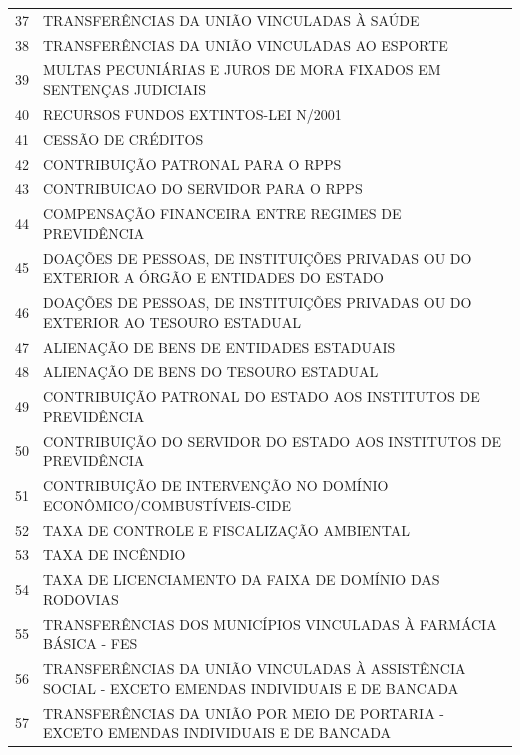 \documentclass{article}
\begin{document}
\begin{longtable}[c]{m{1cm}|m{11cm}}
\multicolumn{1}{c|}{ 37 } & TRANSFERÊNCIAS DA UNIÃO VINCULADAS À SAÚDE \\
\multicolumn{1}{c|}{ 38 } & TRANSFERÊNCIAS DA UNIÃO VINCULADAS AO ESPORTE \\
\multicolumn{1}{c|}{ 39 } & MULTAS PECUNIÁRIAS E JUROS DE MORA FIXADOS EM SENTENÇAS JUDICIAIS \\
\multicolumn{1}{c|}{ 40 } & RECURSOS FUNDOS EXTINTOS-LEI N\degree 13.848/2001 \\
\multicolumn{1}{c|}{ 41 } & CESSÃO DE CRÉDITOS \\
\multicolumn{1}{c|}{ 42 } & CONTRIBUIÇÃO PATRONAL PARA O RPPS \\
\multicolumn{1}{c|}{ 43 } & CONTRIBUICAO DO SERVIDOR PARA O RPPS \\
\multicolumn{1}{c|}{ 44 } & COMPENSAÇÃO FINANCEIRA ENTRE REGIMES DE PREVIDÊNCIA \\
\multicolumn{1}{c|}{ 45 } & DOAÇÕES DE PESSOAS, DE INSTITUIÇÕES PRIVADAS OU DO EXTERIOR A ÓRGÃO E ENTIDADES DO ESTADO \\
\multicolumn{1}{c|}{ 46 } & DOAÇÕES DE PESSOAS, DE INSTITUIÇÕES PRIVADAS OU DO EXTERIOR AO TESOURO ESTADUAL \\
\multicolumn{1}{c|}{ 47 } & ALIENAÇÃO DE BENS DE ENTIDADES ESTADUAIS \\
\multicolumn{1}{c|}{ 48 } & ALIENAÇÃO DE BENS DO TESOURO ESTADUAL \\
\multicolumn{1}{c|}{ 49 } & CONTRIBUIÇÃO PATRONAL DO ESTADO AOS INSTITUTOS DE PREVIDÊNCIA \\
\multicolumn{1}{c|}{ 50 } & CONTRIBUIÇÃO DO SERVIDOR DO ESTADO AOS INSTITUTOS DE PREVIDÊNCIA \\
\multicolumn{1}{c|}{ 51 } & CONTRIBUIÇÃO DE INTERVENÇÃO NO DOMÍNIO ECONÔMICO/COMBUSTÍVEIS-CIDE \\
\multicolumn{1}{c|}{ 52 } & TAXA DE CONTROLE E FISCALIZAÇÃO AMBIENTAL \\
\multicolumn{1}{c|}{ 53 } & TAXA DE INCÊNDIO \\
\multicolumn{1}{c|}{ 54 } & TAXA DE LICENCIAMENTO DA FAIXA DE DOMÍNIO DAS RODOVIAS \\
\multicolumn{1}{c|}{ 55 } & TRANSFERÊNCIAS DOS MUNICÍPIOS VINCULADAS À FARMÁCIA BÁSICA - FES \\
\multicolumn{1}{c|}{ 56 } & TRANSFERÊNCIAS DA UNIÃO VINCULADAS À ASSISTÊNCIA SOCIAL - EXCETO EMENDAS INDIVIDUAIS E DE BANCADA \\
\multicolumn{1}{c|}{ 57 } & TRANSFERÊNCIAS DA UNIÃO POR MEIO DE PORTARIA - EXCETO EMENDAS INDIVIDUAIS E DE BANCADA \\

\end{longtable}
\end{document}
